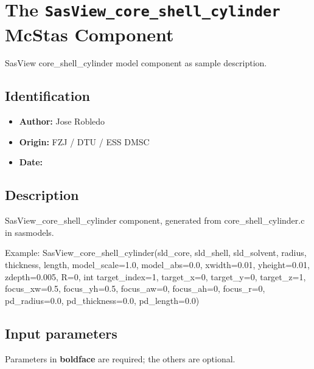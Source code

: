 \section{The \texttt{SasView\_core\_shell\_cylinder} McStas Component}
SasView core\_shell\_cylinder model component as sample description.

\subsection*{Identification}
\begin{itemize}
  \item \textbf{Author:} Jose Robledo
  \item \textbf{Origin:} FZJ / DTU / ESS DMSC
  \item \textbf{Date:} 
\end{itemize}

\subsection*{Description}
SasView\_core\_shell\_cylinder component, generated from core\_shell\_cylinder.c in sasmodels.

Example: SasView\_core\_shell\_cylinder(sld\_core, sld\_shell, sld\_solvent, radius, thickness, length, model\_scale=1.0, model\_abs=0.0, xwidth=0.01, yheight=0.01, zdepth=0.005, R=0, int target\_index=1, target\_x=0, target\_y=0, target\_z=1, focus\_xw=0.5, focus\_yh=0.5, focus\_aw=0, focus\_ah=0, focus\_r=0, pd\_radius=0.0, pd\_thickness=0.0, pd\_length=0.0)

\subsection*{Input parameters}
Parameters in \textbf{boldface} are required; the others are optional.

